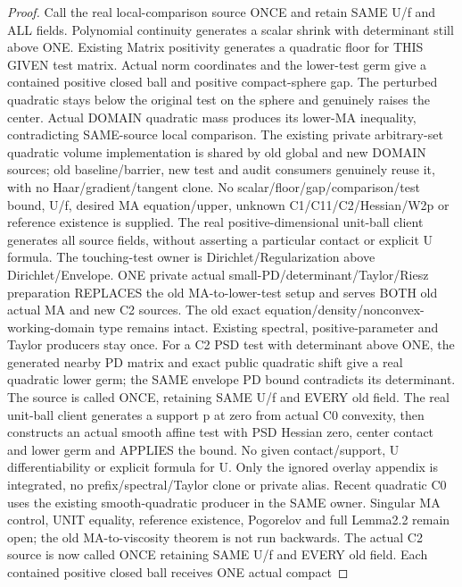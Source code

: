 \begin{proof}
  \leanok
  Call the real local-comparison source ONCE and retain SAME U/f and ALL fields.
  Polynomial continuity generates a scalar shrink with determinant still above
  ONE. Existing Matrix positivity generates a quadratic floor for THIS GIVEN
  test matrix. Actual norm coordinates and the lower-test germ give a contained
  positive closed ball and positive compact-sphere gap. The perturbed quadratic
  stays below the original test on the sphere and genuinely raises the center.
  Actual DOMAIN quadratic mass produces its lower-MA inequality, contradicting
  SAME-source local comparison. The existing private arbitrary-set quadratic
  volume implementation is shared by old global and new DOMAIN sources; old
  baseline/barrier, new test and audit consumers genuinely reuse it, with no
  Haar/gradient/tangent clone. No scalar/floor/gap/comparison/test bound, U/f,
  desired MA equation/upper, unknown C1/C11/C2/Hessian/W2p or reference existence
  is supplied. The real positive-dimensional unit-ball client generates all
  source fields, without asserting a particular contact or explicit U formula.
  The touching-test owner is Dirichlet/Regularization above Dirichlet/Envelope. ONE private
  actual small-PD/determinant/Taylor/Riesz preparation REPLACES the old
  MA-to-lower-test setup and serves BOTH old actual MA and new C2 sources.
  The old exact equation/density/nonconvex-working-domain type remains intact.
  Existing spectral, positive-parameter and Taylor producers stay once. For
  a C2 PSD test with determinant above ONE, the generated nearby PD matrix
  and exact public quadratic shift give a real quadratic lower germ; the
  SAME envelope PD bound contradicts its determinant. The source is called
  ONCE, retaining SAME U/f and EVERY old field. The real unit-ball client
  generates a support p at zero from actual C0 convexity, then constructs an
  actual smooth affine test with PSD Hessian zero, center contact and lower
  germ and APPLIES the bound. No given contact/support, U differentiability
  or explicit formula for U. Only the ignored overlay appendix is integrated,
  no prefix/spectral/Taylor clone or private alias. Recent quadratic C0 uses
  the existing smooth-quadratic producer in the SAME owner. Singular MA
  control, UNIT equality, reference existence, Pogorelov and full Lemma2.2
  remain open; the old MA-to-viscosity theorem is not run backwards.
  The actual C2 source is now called ONCE retaining SAME U/f and EVERY old
  field. Each contained positive closed ball receives ONE actual compact

\end{proof}
